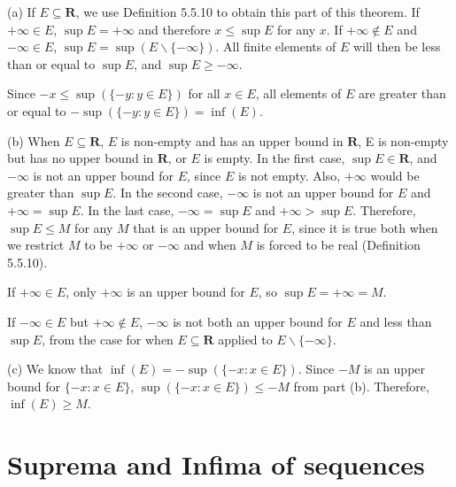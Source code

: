 \documentclass[12pt, oneside]{book}
\begin{document}
	\noindent (a) If $E \subseteq \mathbf{R}$, we use Definition 5.5.10 to obtain this part of this theorem. If $+\infty \in E$, $\sup E = +\infty$ and therefore $x \le \sup E$ for any $x$. If $+\infty \notin E$ and $-\infty \in E$, $\sup E = \sup(E \backslash \{-\infty\})$. All finite elements of $E$ will then be less than or equal to $\sup E$, and $\sup E \ge -\infty$.
	
	Since $-x \le \sup(\{-y: y \in E\})$ for all $x \in E$, all elements of $E$ are greater than or equal to $-\sup(\{-y: y \in E\}) = \inf(E)$.
	
	\bigskip
	\noindent (b) When $E \subseteq \mathbf{R}$, $E$ is non-empty and has an upper bound in $\mathbf{R}$, E is non-empty but has no upper bound in $\mathbf{R}$, or $E$ is empty. In the first case, $\sup E \in \mathbf{R}$, and $-\infty$ is not an upper bound for $E$, since $E$ is not empty.
	Also, $+\infty$ would be greater than $\sup E$. In the second case, $-\infty$ is not an upper bound for $E$ and $+\infty = \sup E$. In the last case, $-\infty = \sup E$ and $+\infty > \sup E$. Therefore, $\sup E \le M$ for any $M$ that is an upper bound for $E$, since it is true both when we restrict $M$ to be $+\infty$ or $-\infty$ and when $M$ is forced to be real (Definition 5.5.10).
	
	If $+\infty \in E$, only $+\infty$ is an upper bound for $E$, so $\sup E = +\infty = M$.
	
	If $-\infty \in E$ but $+\infty \notin E$, $-\infty$ is not both an upper bound for $E$ and less than $\sup E$, from the case for when $E \subseteq \mathbf{R}$ applied to $E \backslash \{-\infty\}$.
	
	(c) We know that $\inf(E) = -\sup(\{-x: x \in E\})$. Since $-M$ is an upper bound for $\{-x: x \in E\}$, $\sup(\{-x: x \in E\}) \le -M$ from part (b). Therefore, $\inf(E) \ge M$.
	
	\section{Suprema and Infima of sequences}
	
\end{document}

